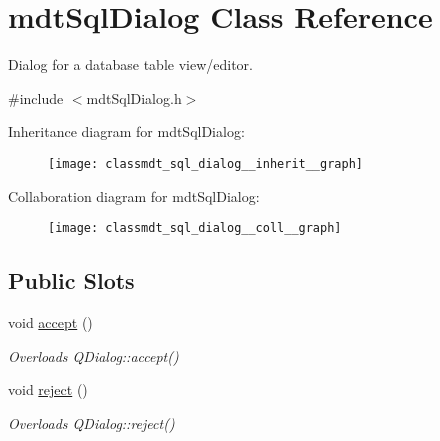 \hypertarget{classmdt_sql_dialog}{\section{mdt\-Sql\-Dialog Class Reference}
\label{classmdt_sql_dialog}
}


Dialog for a database table view/editor.  




{\ttfamily \#include $<$mdt\-Sql\-Dialog.\-h$>$}



Inheritance diagram for mdt\-Sql\-Dialog\-:\nopagebreak
\begin{figure}[H]
\begin{center}
\leavevmode
\texttt{[image: classmdt\_sql\_dialog\_\_inherit\_\_graph]}
\end{center}
\end{figure}


Collaboration diagram for mdt\-Sql\-Dialog\-:\nopagebreak
\begin{figure}[H]
\begin{center}
\leavevmode
\texttt{[image: classmdt\_sql\_dialog\_\_coll\_\_graph]}
\end{center}
\end{figure}
\subsection*{Public Slots}
\begin{DoxyCompactItemize}
\item 
void \hyperlink{classmdt_sql_dialog_affba1732b5f32db150d0e700ecc339f8}{accept} ()
\begin{DoxyCompactList}\small\item\em Overloads Q\-Dialog\-::accept() \end{DoxyCompactList}\item 
void \hyperlink{classmdt_sql_dialog_ada1726d5861cb071fab7a1c31bc52abb}{reject} ()
\begin{DoxyCompactList}\small\item\em Overloads Q\-Dialog\-::reject() \end{DoxyCompactList}\end{DoxyCompactItemize}
